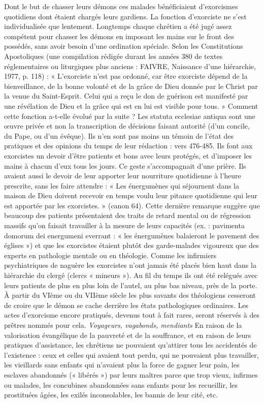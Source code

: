  Dont le but de chasser leurs démons ces malades bénéficiaient d'exorcismes quotidiens dont étaient chargés leurs gardiens. La fonction d'exorciste ne s'est individualisée que lentement. Longtemps chaque chrétien a été jugé assez compétent pour chasser les démons en imposant les mains sur le front des possédés, sans avoir besoin d'une ordination spéciale. Selon les Constitutions Apostoliques (une compilation rédigée durant les années 380 de textes réglementaires ou liturgiques plus anciens : FAIVRE, Naissance d'une hiérarchie, 1977, p. 118) : « L'exorciste n'est pas ordonné, car être exorciste dépend de la bienveillance, de la bonne volonté et de la grâce de Dieu donnée par le Christ par la venue du Saint-Esprit. Celui qui a reçu le don de guérison est manifesté par une révélation de Dieu et la grâce qui est en lui est visible pour tous. » 
 Comment cette fonction a-t-elle évolué par la suite ? Les statuta ecclesiae antiqua sont une œuvre privée et non la transcription de décisions faisant autorité (d'un concile, du Pape, ou d'un évêque). Ils n'en sont pas moins un témoin de l'état des pratiques et des opinions du temps de leur rédaction : vers 476-485. Ils font aux exorcistes un devoir d'être patients et bons avec leurs protégés, et d'imposer les mains à chacun d'eux tous les jours. Ce geste s'accompagnait d'une prière. Ils avaient aussi le devoir de leur apporter leur nourriture quotidienne à l'heure prescrite, sans les faire attendre : « Les énergumènes qui séjournent dans la maison de Dieu doivent recevoir en temps voulu leur pitance quotidienne qui leur est apportée par les exorcistes. » (canon 64). Cette dernière remarque suggère que beaucoup des patients présentaient des traits de retard mental ou de régression massifs qu'on faisait travailler à la mesure de leurs capacités (ex. : pavimenta domorum dei energumeni everrant : « les énergumènes balaieront le pavement des églises ») et que les exorcistes étaient plutôt des garde-malades vigoureux que des experts en pathologie mentale ou en théologie. 
 Comme les infirmiers psychiatriques de naguère les exorcistes n'ont jamais été placés bien haut dans la hiérarchie du clergé (clercs « mineurs »). Au fil du temps ils ont été relégués avec leurs patients de plus en plus loin de l'autel, au plus bas niveau, près de la porte. À partir du VIème ou du VIIème siècle les plus savants des théologiens cesseront de croire que le démon se cache derrière les états pathologiques ordinaires. Les actes d'exorcisme encore pratiqués, devenus tout à fait rares, seront réservés à des prêtres nommés pour cela. 
\emph{Voyageurs, vagabonds, mendiants
}En raison de la valorisation évangélique de la pauvreté et de la souffrance, et en raison de leurs pratiques d'assistance, les chrétiens ne pouvaient qu'attirer tous les accidentés de l'existence : ceux et celles qui avaient tout perdu, qui ne pouvaient plus travailler, les vieillards sans enfants qui n'avaient plus la force de gagner leur pain, les esclaves abandonnés (« libérés ») par leurs maîtres parce que trop vieux, infirmes ou malades, les concubines abandonnées sans enfants pour les recueillir, les prostituées âgées, les exilés inconsolables, les bannis de leur cité, etc. 
